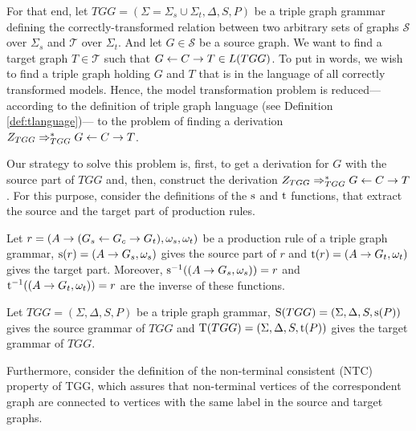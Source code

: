\documentclass[]{report}
\begin{document}
For that end, let $TGG = (\Sigma = \Sigma_s \cup \Sigma_t, \Delta, S, P)$ be a triple graph grammar defining the correctly-transformed relation between two arbitrary sets of graphs $\mathcal{S}$ over $\Sigma_s$ and $\mathcal{T}$ over $\Sigma_t$. And let $G \in \mathcal{S}$ be a source graph. We want to find a target graph $T \in \mathcal{T}$ such that $G \overset{}{\leftarrow} C \overset{}{\rightarrow} T \in L(TGG)$. To put in words, we wish to find a triple graph holding $G$ and $T$ that is in the language of all correctly transformed models. Hence, the model transformation problem is reduced--- according to the definition of triple graph language (see Definition \ref{def:tlanguage})--- to the problem of finding a derivation $Z_{TGG} \Rightarrow^*_{TGG} G \overset{}{\leftarrow} C \overset{}{\rightarrow} T$.

Our strategy to solve this problem is, first, to get a derivation for $G$ with the source part of $TGG$ and, then, construct the derivation $Z_{TGG} \Rightarrow^*_{TGG} G \overset{}{\leftarrow} C \overset{}{\rightarrow} T$. For this purpose, consider the definitions of the $\operatorname{s}$ and $\operatorname{t}$ functions, that extract the source and the target part of production rules.

\begin{definition}
	\label{def:source}
	Let $r = (A \to (G_s \overset{}{\leftarrow} G_c \overset{}{\rightarrow} G_t), \omega_s, \omega_t)$ be a production rule of a triple graph grammar, $\operatorname{s}(r) = (A \to G_s,\omega_s)$ gives the source part of $r$ and $\operatorname{t}(r) = (A \to G_t,\omega_t)$ gives the target part. Moreover, $\operatorname{s}^{-1}((A \to G_s,\omega_s)) = r$ and $\operatorname{t}^{-1}((A \to G_t,\omega_t)) = r$ are the inverse of these functions.
\end{definition}

\begin{definition}
	\label{def:Source}
	Let $TGG = (\Sigma, \Delta, S, P)$ be a triple graph grammar, $\operatorname{S}(TGG) = (\Sigma, \Delta, S, \operatorname{s}(P))$ gives the source grammar of $TGG$ and $\operatorname{T}(TGG) = (\Sigma, \Delta, S, \operatorname{t}(P))$ gives the target grammar of $TGG$.
\end{definition}

Furthermore, consider the definition of the non-terminal consistent (NTC) property of TGG, which assures that non-terminal vertices of the correspondent graph are connected to vertices with the same label in the source and target graphs.
\end{document}
